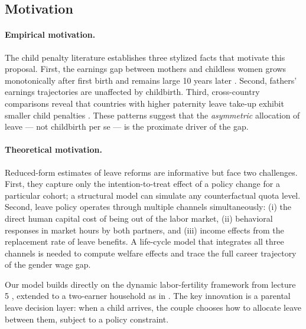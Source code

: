 \subsection{Motivation}

\paragraph{Empirical motivation.}
The child penalty literature establishes three stylized facts that motivate this proposal. First, the earnings gap between mothers and childless women grows monotonically after first birth and remains large 10 years later \citep{kleven2019children}. Second, fathers' earnings trajectories are unaffected by childbirth. Third, cross-country comparisons reveal that countries with higher paternity leave take-up exhibit smaller child penalties \citep{kleven2019childpenalties}. These patterns suggest that the \textit{asymmetric} allocation of leave --- not childbirth per se --- is the proximate driver of the gap.

\paragraph{Theoretical motivation.}
Reduced-form estimates of leave reforms are informative but face two challenges. First, they capture only the intention-to-treat effect of a policy change for a particular cohort; a structural model can simulate any counterfactual quota level. Second, leave policy operates through multiple channels simultaneously: (i) the direct human capital cost of being out of the labor market, (ii) behavioral responses in market hours by both partners, and (iii) income effects from the replacement rate of leave benefits. A life-cycle model that integrates all three channels is needed to compute welfare effects and trace the full career trajectory of the gender wage gap.

Our model builds directly on the dynamic labor-fertility framework from lecture 5 \citep{kleven2019children}, extended to a two-earner household as in \citet{borella2023marriage}. The key innovation is a parental leave decision layer: when a child arrives, the couple chooses how to allocate leave between them, subject to a policy constraint.
